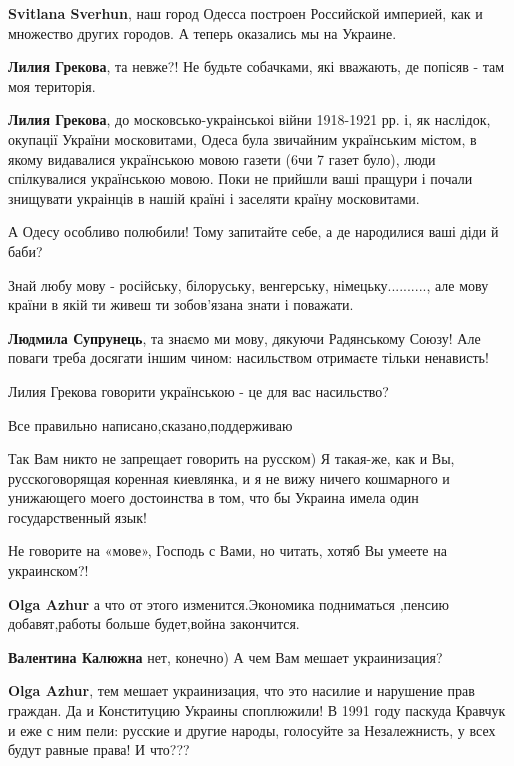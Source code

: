 \begin{itemize}
\begin{itemize}
\textbf{Svitlana Sverhun}, наш город Одесса построен Российской империей, как и множество других городов. А теперь оказались мы на Украине.

\textbf{Лилия Грекова}, та невже?! Не будьте собачками, які вважають, де попісяв - там моя територія.

\textbf{Лилия Грекова}, до московсько-украінськоі війни 1918-1921 рр. і, як
наслідок, окупації України московитами, Одеса була звичайним українським
містом, в якому видавалися українською мовою газети (6чи 7 газет було), люди
спілкувалися українською мовою. Поки не прийшли ваші пращури і почали знищувати
украінців в нашій країні і заселяти країну московитами.

А Одесу особливо полюбили! Тому запитайте себе, а де народилися ваші діди й
баби?

\end{itemize}

Знай любу мову - російську, білоруську, венгерську, німецьку.........., але
мову країни в якій ти живеш ти зобов'язана знати і поважати.

\begin{itemize}
\textbf{Людмила Супрунець}, та знаємо ми мову, дякуючи Радянському Союзу! Але поваги треба досягати іншим чином: насильством отримаєте тільки ненависть!

Лилия Грекова говорити українською - це для вас насильство?
\end{itemize}

Все правильно написано,сказано,поддерживаю


Так Вам никто не запрещает говорить на русском) Я такая-же, как и Вы,
русскоговорящая коренная киевлянка, и я не вижу ничего кошмарного и унижающего
моего достоинства в том, что бы Украина имела один государственный язык!

Не говорите на «мове», Господь с Вами, но читать, хотяб Вы умеете на украинском?!

\textbf{Olga Azhur} а что от этого изменится.Экономика подниматься ,пенсию добавят,работы больше будет,война закончится.

\textbf{Валентина Калюжна} нет, конечно) А чем Вам мешает украинизация?

\textbf{Olga Azhur}, тем мешает украинизация, что это насилие и нарушение прав
граждан. Да и Конституцию Украины споплюжили! В 1991 году паскуда Кравчук и еже
с ним пели: русские и другие народы, голосуйте за Незалежнисть, у всех будут
равные права! И что???


\end{itemize}
